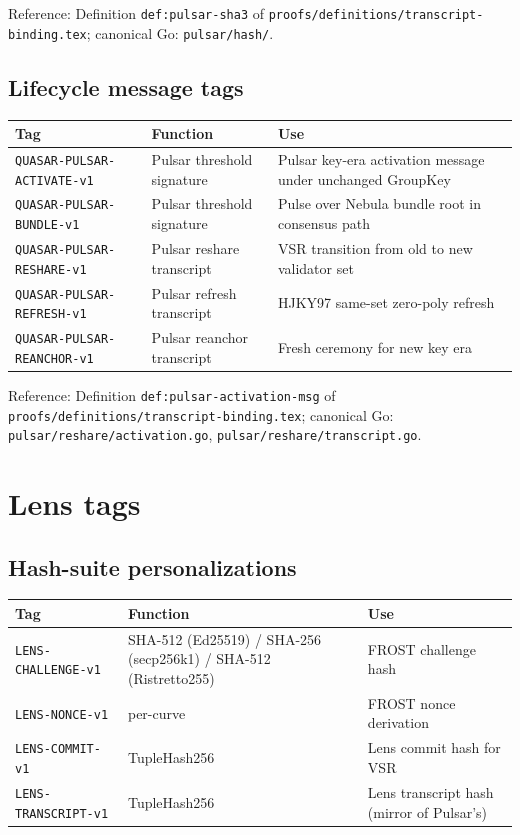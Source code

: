 \documentclass[11pt,a4paper]{article}
\begin{document}
Reference: Definition \texttt{def:pulsar-sha3} of \texttt{proofs/definitions/transcript-binding.tex}; canonical Go: \texttt{pulsar/hash/}.

\subsection{Lifecycle message tags}

\begin{tabularx}{\textwidth}{@{}p{}p{}X@{}}
  \toprule
  \textbf{Tag} & \textbf{Function} & \textbf{Use} \\
  \midrule
  \texttt{QUASAR-PULSAR-ACTIVATE-v1} & Pulsar threshold signature & Pulsar key-era activation message under unchanged GroupKey \\
  \texttt{QUASAR-PULSAR-BUNDLE-v1}   & Pulsar threshold signature & Pulse over Nebula bundle root in consensus path \\
  \texttt{QUASAR-PULSAR-RESHARE-v1}  & Pulsar reshare transcript & VSR transition from old to new validator set \\
  \texttt{QUASAR-PULSAR-REFRESH-v1}  & Pulsar refresh transcript & HJKY97 same-set zero-poly refresh \\
  \texttt{QUASAR-PULSAR-REANCHOR-v1} & Pulsar reanchor transcript & Fresh ceremony for new key era \\
  \bottomrule
\end{tabularx}

Reference: Definition \texttt{def:pulsar-activation-msg} of \texttt{proofs/definitions/transcript-binding.tex}; canonical Go: \texttt{pulsar/reshare/activation.go}, \texttt{pulsar/reshare/transcript.go}.

\section{Lens tags}

\subsection{Hash-suite personalizations}

\begin{tabularx}{\textwidth}{@{}p{}p{}X@{}}
  \toprule
  \textbf{Tag} & \textbf{Function} & \textbf{Use} \\
  \midrule
  \texttt{LENS-CHALLENGE-v1}    & SHA-512 (Ed25519) / SHA-256 (secp256k1) / SHA-512 (Ristretto255) & FROST challenge hash \\
  \texttt{LENS-NONCE-v1}        & per-curve & FROST nonce derivation \\
  \texttt{LENS-COMMIT-v1}       & TupleHash256 & Lens commit hash for VSR \\
  \texttt{LENS-TRANSCRIPT-v1}   & TupleHash256 & Lens transcript hash (mirror of Pulsar's) \\
  \bottomrule
\end{tabularx}
\end{document}
